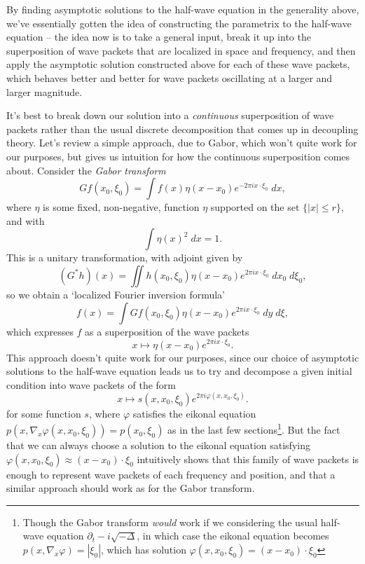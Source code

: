 \documentclass{article}
\theoremstyle{plain}
\theoremstyle{remark}
\theoremstyle{definition}
\begin{document}
By finding asymptotic solutions to the half-wave equation in the generality above, we've essentially gotten the idea of constructing the parametrix to the half-wave equation -- the idea now is to take a general input, break it up into the superposition of wave packets that are localized in space and frequency, and then apply the asymptotic solution constructed above for each of these wave packets, which behaves better and better for wave packets oscillating at a larger and larger magnitude.

It's best to break down our solution into a \emph{continuous} superposition of wave packets rather than the usual discrete decomposition that comes up in decoupling theory. Let's review a simple approach, due to Gabor, which won't quite work for our purposes, but gives us intuition for how the continuous superposition comes about. Consider the \emph{Gabor transform}
%
\[ Gf(x_0,\xi_0) = \int f(x) \eta(x - x_0) e^{- 2 \pi i x \cdot \xi_0}\; dx, \]
%
where $\eta$ is some fixed, non-negative, function $\eta$ supported on the set $\{ |x| \leq r \}$, and with
%
\[ \int \eta(x)^2\; dx = 1. \]
%
This is a unitary transformation, with adjoint given by
%
\[ (G^*h)(x) = \iint h(x_0,\xi_0) \eta(x - x_0) e^{2 \pi i x \cdot \xi_0}\; dx_0\; d\xi_0, \]
%
so we obtain a `localized Fourier inversion formula'
%
\[ f(x) = \int Gf(x_0,\xi_0) \eta(x - x_0) e^{2 \pi i x \cdot \xi_0}\; dy\; d\xi, \]
%
which expresses $f$ as a superposition of the wave packets
%
\[ x \mapsto \eta(x - x_0) e^{2 \pi i x \cdot \xi_0}. \]
%
This approach doesn't quite work for our purposes, since our choice of asymptotic solutions to the half-wave equation leads us to try and decompose a given initial condition into wave packets of the form
%
\[ x \mapsto s(x,x_0,\xi_0) e^{2 \pi i \varphi(x,x_0, \xi_0)}. \]
%
for some function $s$, where $\varphi$ satisfies the eikonal equation $p(x,\nabla_x \varphi(x,x_0,\xi_0)) = p(x_0,\xi_0)$ as in the last few sections\footnote{Though the Gabor transform \emph{would} work if we considering the usual half-wave equation $\partial_t - i \sqrt{-\Delta}$, in which case the eikonal equation becomes $p(x,\nabla_x \varphi) = |\xi_0|$, which has solution $\varphi(x,x_0,\xi_0) = (x - x_0) \cdot \xi_0$}. But the fact that we can always choose a solution to the eikonal equation satisfying $\varphi(x,x_0,\xi_0) \approx (x - x_0) \cdot \xi_0$ intuitively shows that this family of wave packets is enough to represent wave packets of each frequency and position, and that a similar approach should work as for the Gabor transform.
\end{document}
